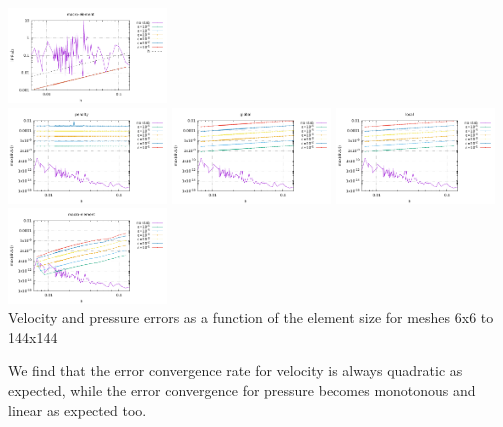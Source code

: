 \begin{center}
\includegraphics[width=4.21cm]{python_codes/fieldstone_115/results/dh/errorsP_macro.pdf}\\
\includegraphics[width=4.21cm]{python_codes/fieldstone_115/results/dh/divv_penalty.pdf}
\includegraphics[width=4.21cm]{python_codes/fieldstone_115/results/dh/divv_global.pdf}
\includegraphics[width=4.21cm]{python_codes/fieldstone_115/results/dh/divv_local.pdf}
\includegraphics[width=4.21cm]{python_codes/fieldstone_115/results/dh/divv_macro.pdf}\\
{\captionfont Velocity and pressure errors as a function of the element size for meshes 6x6 to 144x144}
\end{center}
We find that the error convergence rate for velocity is always quadratic as expected, 
while the error convergence for pressure becomes monotonous and linear as expected too.

